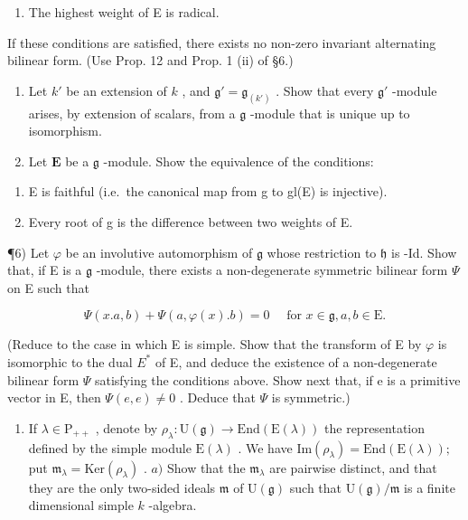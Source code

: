 \begin{enumerate}
\def\labelenumi{(\roman{enumi})}
\setcounter{enumi}{3}
\tightlist
\item
  The highest weight of E is radical.
\end{enumerate}

If these conditions are satisfied, there exists no non-zero invariant alternating bilinear form. (Use Prop. 12 and Prop. 1 (ii) of §6.)

\begin{enumerate}
\def\labelenumi{\arabic{enumi})}
\setcounter{enumi}{3}
\item
  Let \(k'\) be an extension of \(k\) , and \(\mathfrak{g}' = \mathfrak{g}_{(k')}\) . Show that every \(\mathfrak{g}'\) -module arises, by extension of scalars, from a \(\mathfrak{g}\) -module that is unique up to isomorphism.
\item
  Let \(\mathbf{E}\) be a \(\mathfrak{g}\) -module. Show the equivalence of the conditions:
\end{enumerate}

\begin{enumerate}
\def\labelenumi{(\roman{enumi})}
\item
  E is faithful (i.e.~the canonical map from g to gl(E) is injective).
\item
  Every root of g is the difference between two weights of E.
\end{enumerate}

¶6) Let \(\varphi\) be an involutive automorphism of \(\mathfrak{g}\) whose restriction to \(\mathfrak{h}\) is -Id. Show that, if E is a \(\mathfrak{g}\) -module, there exists a non-degenerate symmetric bilinear form \(\varPsi\) on E such that

\[
\varPsi (x. a, b) + \varPsi (a, \varphi (x). b) = 0 \quad \text {   for   } x \in \mathfrak {g}, a, b \in \mathrm{E}.
\]

(Reduce to the case in which E is simple. Show that the transform of E by \(\varphi\) is isomorphic to the dual \(E^{*}\) of E, and deduce the existence of a non-degenerate bilinear form \(\Psi\) satisfying the conditions above. Show next that, if e is a primitive vector in E, then \(\Psi(e,e)\neq0\) . Deduce that \(\Psi\) is symmetric.)

\begin{enumerate}
\def\labelenumi{\arabic{enumi})}
\setcounter{enumi}{6}
\tightlist
\item
  If \(\lambda \in \mathrm{P}_{++}\) , denote by \(\rho_{\lambda}:\mathrm{U}(\mathfrak{g})\to \mathrm{End}(\mathrm{E}(\lambda))\) the representation defined by the simple module \(\mathrm{E}(\lambda)\) . We have \(\mathrm{Im}(\rho_{\lambda}) = \mathrm{End}(\mathrm{E}(\lambda));\) put \(\mathfrak{m}_{\lambda} = \mathrm{Ker}(\rho_{\lambda})\) . \(a)\) Show that the \(\mathfrak{m}_{\lambda}\) are pairwise distinct, and that they are the only two-sided ideals \(\mathfrak{m}\) of \(\mathrm{U}(\mathfrak{g})\) such that \(\mathrm{U}(\mathfrak{g}) / \mathfrak{m}\) is a finite dimensional simple \(k\) -algebra.
\end{enumerate}

